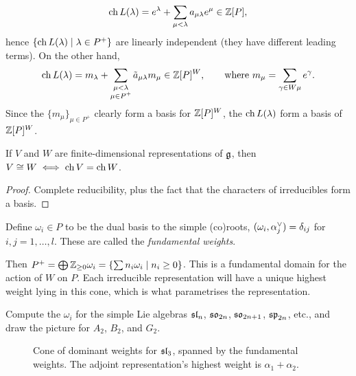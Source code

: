 \begin{corollary}
\[
  \ch L(\lambda) = e^\lambda + \sum_{\mu < \lambda} a_{\mu\lambda}e^\mu \in \Z[P],
\]
hence $\setc{\ch L(\lambda)}{\lambda \in P^+}$ are linearly independent (they
have different leading terms). On the other hand,
\[
  \ch L(\lambda) = m_\lambda + \sum_{\substack{\mu < \lambda\\ \mu \in P^+}} \tilde a_{\mu\lambda}m_\mu
    \in \Z[P]^W, \qquad \text{where } m_\mu = \sum_{\gamma \in W\mu} e^\gamma.
\]
Since the $\{m_\mu\}_{\mu \in P^+}$ clearly form a basis for $\Z[P]^W$, the
$\ch L(\lambda)$ form a basis of $\Z[P]^W$.
\end{corollary}

\begin{corollary}
If $V$ and $W$ are finite-dimensional representations of $\g$, then
$V \cong W \iff \ch V = \ch W$.
\end{corollary}

\begin{proof}
Complete reducibility, plus the fact that the characters of irreducibles form a
basis.
\end{proof}

\begin{definition}
Define $\omega_i \in P$ to be the dual basis to the simple (co)roots,
$(\omega_i, \alpha_j\cv) = \delta_{ij}$ for $i, j = 1, \dots, l$. These are
called the \emph{fundamental weights}.
\end{definition}

Then $P^+ = \bigoplus \Z_{\geq 0}\omega_i = \setc{\sum n_i\omega_i}{n_i \geq 0}$.
This is a fundamental domain for the action of $W$ on $P$. Each irreducible
representation will have a unique highest weight lying in this cone, which is
what parametrises the representation.

\begin{exercise}
Compute the $\omega_i$ for the simple Lie algebras $\sl_n$, $\so_{2n}$,
$\so_{2n+1}$, $\spl_{2n}$, etc., and draw the picture for $A_2$, $B_2$, and
$G_2$.
\end{exercise}

\begin{figure}[!htbp]
\centering
{}
\caption{Cone of dominant weights for $\sl_3$, spanned by the fundamental
weights. The adjoint representation's highest weight is $\alpha_1 + \alpha_2$.}
\label{fig:dominant-sl3}
\end{figure}

